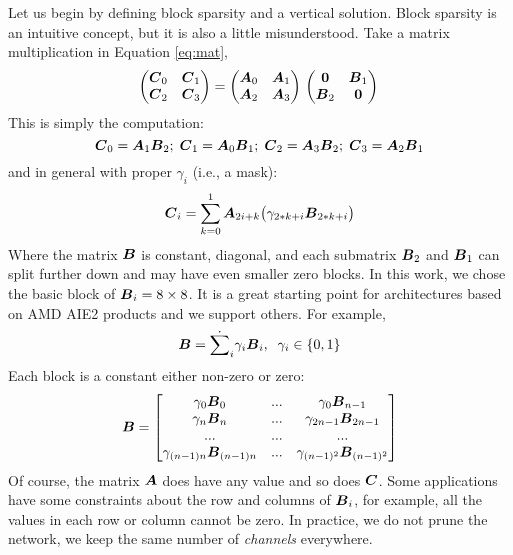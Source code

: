 \documentclass[conference]{IEEEtran}
\begin{document}
Let us begin by defining block sparsity and a vertical solution. Block
sparsity is an intuitive concept, but it is also a little
misunderstood. Take a matrix multiplication in Equation
\ref{eq:mat},
\begin{equation}
  \label{eq:mat}
  \begin{pmatrix}
    \Vc{C}_0 & \Vc{C}_1 \\
    \Vc{C}_2 & \Vc{C}_3 \\ 
  \end{pmatrix} = 
  \begin{pmatrix}
    \Vc{A}_0 & \Vc{A}_1 \\
    \Vc{A}_2 & \Vc{A}_3 \\ 
  \end{pmatrix}\\
  \begin{pmatrix}
    \Vc{0}   & \Vc{B}_1 \\
    \Vc{B}_2 & \Vc{0} \\ 
  \end{pmatrix}\\
\end{equation}
This is simply the computation: 
{\small \begin{equation}
  {\boldsymbol C}_0 = {\boldsymbol A}_{1} {\boldsymbol B}_{2}; \;
  {\boldsymbol C}_1 = {\boldsymbol A}_{0} {\boldsymbol B}_{1}; \;
  {\boldsymbol C}_2 = {\boldsymbol A}_{3} {\boldsymbol B}_{2}; \;
  {\boldsymbol C}_3 = {\boldsymbol A}_{2} {\boldsymbol B}_{1}
\end{equation}}
and in general with proper $\gamma_i$ (i.e., a mask):
\begin{equation}
  {\boldsymbol C}_i = \sum_{k=0}^1 {\boldsymbol A}_{2i+ k} \big(\gamma_{2*k+i} {\boldsymbol B}_{2*k+i}\big)
\end{equation}
Where the matrix ${\boldsymbol B}$ is constant, diagonal, and each submatrix
${\boldsymbol B_2}$ and ${\boldsymbol B}_1$ can split further down and may have even
smaller zero blocks. In this work, we chose the basic block of
${\boldsymbol B}_i = 8\times 8$. It is a great starting point for architectures
based on AMD AIE2 products and we support others.  For example,
\begin{equation}
  {\boldsymbol B} = \dot{\sum}_i \gamma_i {\boldsymbol B}_i, \;\; \gamma_i \in \{0,1\} 
\end{equation}
Each block is a constant either non-zero or zero:
{\small \begin{equation*}
  {\boldsymbol B} = 
  \begin{bmatrix}
    \gamma_0{\boldsymbol B}_0   &  ... &   \gamma_0{\boldsymbol B}_{n-1} \\
    \gamma_n{\boldsymbol B}_{n} &  ... &   \gamma_{2n-1}{\boldsymbol B}_{2n-1} \\
    ...               &  ... &   ... \\
    \gamma_{(n-1)n}{\boldsymbol B}_{(n-1)n} & ... &   \gamma_{(n-1)^2}{\boldsymbol B}_{(n-1)^2} \\
  \end{bmatrix}
\end{equation*}}
Of course, the matrix ${\boldsymbol A}$ does have any value and so does
${\boldsymbol C}$. Some applications have some constraints about the row and
columns of ${\boldsymbol B}_i$, for example, all the values in each row or
column cannot be zero. In practice, we do not prune the network, we
keep the same number of {\em channels} everywhere.
\end{document}
